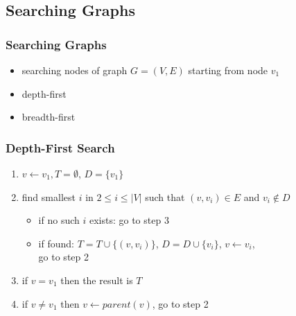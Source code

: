 \documentclass[dvipsnames]{beamer}
\begin{document}
\subsection{Searching Graphs}

\begin{frame}
  \frametitle{Searching Graphs}

  \begin{itemize}
    \item searching nodes of graph $G=(V,E)$ starting from node $v_1$

    \bigskip
    \item depth-first
    \item breadth-first
  \end{itemize}
\end{frame}

\begin{frame}
  \frametitle{Depth-First Search}

  \begin{enumerate}
    \item $v \leftarrow v_1, T=\emptyset$, $D=\{v_1\}$

    \pause
    \item find smallest $i$ in $2 \leq i \leq |V|$
      such that $(v,v_i) \in E$ and $v_i \notin D$
      \begin{itemize}
        \item if no such $i$ exists: go to step 3
        \item if found: $T=T \cup \{(v,v_i)\}$, $D=D \cup \{v_i\}$,
          $v \leftarrow v_i$,\\
          go to step 2
      \end{itemize}

    \pause
    \item if $v=v_1$ then the result is $T$

    \pause
    \item if $v \neq v_1$ then $v \leftarrow parent(v)$, go to step 2
  \end{enumerate}
\end{frame}

\end{document}
